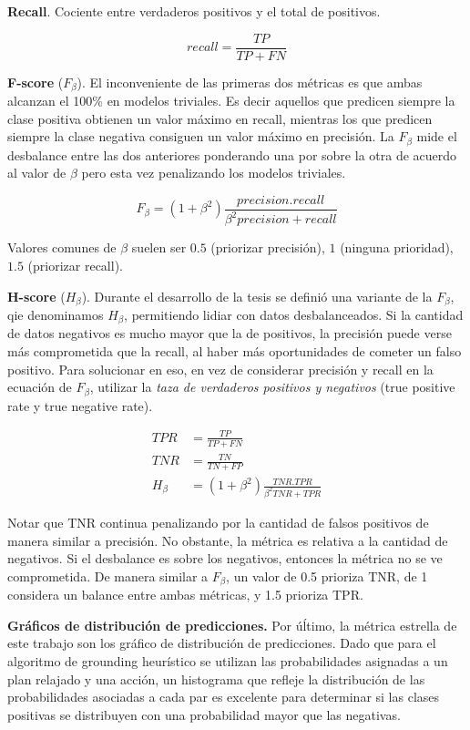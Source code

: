 \textbf{Recall}. Cociente entre verdaderos positivos y el total de positivos.

\begin{equation}
    recall = \frac{TP}{TP + FN}
\end{equation}

\textbf{F-score} ($F_{\beta}$). El inconveniente de las primeras dos métricas es
que ambas alcanzan el 100\% en modelos triviales. Es decir aquellos que predicen
siempre la clase positiva obtienen un valor máximo en recall, mientras los que
predicen siempre la clase negativa consiguen un valor máximo en precisión. La
$F_{\beta}$ mide el desbalance entre las dos anteriores ponderando una por sobre
la otra de acuerdo al valor de $\beta$ pero esta vez penalizando los modelos
triviales. 

\begin{equation}
    F_{\beta} = (1 + \beta^2) \frac{precision . recall}{\beta^2 precision + recall}
\end{equation}

Valores comunes de $\beta$ suelen ser $0.5$ (priorizar precisión), $1$ (ninguna
prioridad), $1.5$ (priorizar recall).

\textbf{H-score} ($H_{\beta}$). Durante el desarrollo de la tesis se definió una
variante de la $F_{\beta}$, qie denominamos $H_{\beta}$, permitiendo lidiar con
datos desbalanceados. Si la cantidad de datos negativos es mucho mayor que la de
positivos, la precisión puede verse más comprometida que la recall, al haber más
oportunidades de cometer un falso positivo. Para solucionar en eso, en vez de
considerar precisión y recall en la ecuación de $F_{\beta}$, utilizar la
\emph{taza de verdaderos positivos y negativos} (true positive rate y true
negative rate).

\begin{align}
    TPR &= \frac{TP}{TP + FN} \\
    TNR &= \frac{TN}{TN + FP} \\
    H_{\beta} &= (1 + \beta^2) \frac{TNR . TPR}{\beta^2 TNR + TPR}
\end{align}

Notar que TNR continua penalizando por la cantidad de falsos positivos de manera
similar a precisión. No obstante, la métrica es relativa a la cantidad de
negativos. Si el desbalance es sobre los negativos, entonces la métrica no se ve
comprometida. De manera similar a $F_{\beta}$, un valor de 0.5 prioriza TNR, de
1 considera un balance entre ambas métricas, y 1.5 prioriza TPR.

\textbf{Gráficos de distribución de predicciones.} Por úĺtimo, la métrica
estrella de este trabajo son los gráfico de distribución de predicciones. Dado
que para el algoritmo de grounding heurístico se utilizan las probabilidades
asignadas a un plan relajado y una acción, un histograma que refleje la
distribución de las probabilidades asociadas a cada par es excelente para
determinar si las clases positivas se distribuyen con una probabilidad mayor que
las negativas.